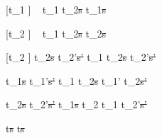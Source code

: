 [t_1 \neq \Fail]
  {\ }
  {t_1 \ExOr t_2\st{s} \handle{\Pick \First} t_1\st{s}}

[t_2 \neq \Fail]
  {\ }
  {t_1 \ExOr t_2\st{s} \handle{\Pick \Second} t_2\st{s}}

[t_2 \neq \Fail]
  {t_2\st{s} \handle{\Pick \pi} t_2'\st{s'}}
  {t_1 \ExOr t_2\st{s} \handle{\Pick \Other \pi} t_2'\st{s'}}

  {t_1\st{s}  t_1'\st{s'} }
  {t_1 \AndOr t_2\st{s}  t_1' \AndOr t_2\st{s'}}

  {t_2\st{s}  t_2'\st{s'} }
  {t_1\st{s} \AndOr t_2  t_1 \AndOr t_2'\st{s'}}

  { }
  {t\st{s}  t\st{s}}
